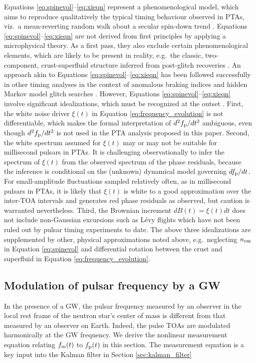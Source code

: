 \documentclass[fleqn,usenatbib,useAMS]{mnras}
\begin{document}
Equations \eqref{eq:spinevol}--\eqref{eq:xieqn} represent a phenomenological model, which aims to reproduce qualitatively the typical timing behaviour observed in PTAs, viz.\ a mean-reverting random walk about a secular spin-down trend \citep{NANOgrav2023,EPTA2023,Zic2023arXiv230616230Z}. Equations \eqref{eq:spinevol}--\eqref{eq:xieqn} are not derived from first principles by applying a microphysical theory. As a first pass, they also exclude certain phenomenological elements, which are likely to be present in reality, e.g.\ the classic, two-component, crust-superfluid structure inferred from post-glitch recoveries \citep{Baym1969,vanEysden,Alpar2017MNRAS.471.4827G}. An approach akin to Equations \eqref{eq:spinevol}--\eqref{eq:xieqn} has been followed successfully in other timing analyses in the context of anomalous braking indices \citep{Vargas} and hidden Markov model glitch searches \citep{Melatos2020ApJ...896...78M,Lower2021MNRAS.508.3251L,Dunn2022,Dunn2023MNRAS.522.5469D}. However, Equations \eqref{eq:spinevol}--\eqref{eq:xieqn}  involve significant idealizations, which must be recognized at the outset \citep{Meyers2021,Myers2021MNRAS.502.3113M,Vargas}. First, the white noise driver $\xi(t)$ in Equation \eqref{eq:frequency_evolution} is not differentiable, which makes the formal interpretation of $d^2 f_{\rm p} / dt^2$ ambiguous, even though $d^2 f_{\rm p} / dt^2$ is not used in the PTA analysis proposed in this paper. Second, the white spectrum assumed for $\xi(t)$ may or may not be suitable for millisecond pulsars in PTAs. It is challenging observationally to infer the spectrum of $\xi(t)$ from the observed spectrum of the phase residuals, because the inference is conditional on the (unknown) dynamical model governing $df_{\rm p}/dt$. For small-amplitude fluctuations sampled relatively often, as in millisecond pulsars in PTAs, it is likely that $\xi(t)$ is white to a good approximation over the inter-TOA intervals and generates red phase residuals as observed, but caution is warranted nevertheless. Third, the Brownian increment $dB(t)=\xi(t)dt$ does not include non-Gaussian excursions such as L\'{e}vy flights \citep{Sornette2004} which have not been ruled out by pulsar timing experiments to date. The above three idealizations are supplemented by other, physical approximations noted above, e.g.\ neglecting $n_{\rm em}$ in Equation \eqref{eq:spinevol} and differential rotation between the crust and superfluid in Equation \eqref{eq:frequency_evolution}.



\subsection{Modulation of pulsar frequency by a GW} \label{sec:psr_measured}
In the presence of a GW, the pulsar frequency measured by an observer in the local rest frame of the neutron star's center of mass is different from that measured by an observer on Earth. Indeed, the pulse TOAs are modulated harmonically at the GW frequency. We derive the nonlinear measurement equation relating $f_{\rm m}(t)$ to $f_{\rm p}(t)$ in this section. The measurement equation is a key input into the Kalman filter in Section \eqref{sec:kalman_filter}
\end{document}
